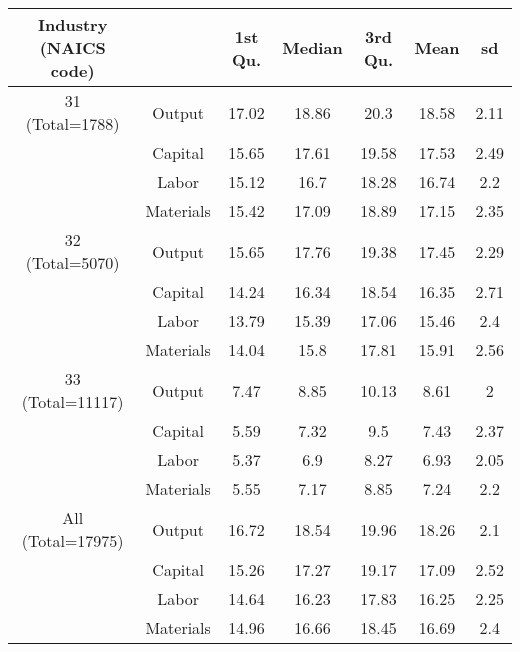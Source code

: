 \begin{table}[H]
\centering
\begin{tabular}{ccccccc}
  \hline\hline Industry (NAICS code) &   & 1st Qu. & Median & 3rd Qu. & Mean & sd \\ 
  \hline
31 (Total=1788) & Output & 17.02 & 18.86 & 20.3 & 18.58 & 2.11 \\ 
   & Capital & 15.65 & 17.61 & 19.58 & 17.53 & 2.49 \\ 
   & Labor & 15.12 & 16.7 & 18.28 & 16.74 & 2.2 \\ 
   & Materials & 15.42 & 17.09 & 18.89 & 17.15 & 2.35 \\ 
  32 (Total=5070) & Output & 15.65 & 17.76 & 19.38 & 17.45 & 2.29 \\ 
   & Capital & 14.24 & 16.34 & 18.54 & 16.35 & 2.71 \\ 
   & Labor & 13.79 & 15.39 & 17.06 & 15.46 & 2.4 \\ 
   & Materials & 14.04 & 15.8 & 17.81 & 15.91 & 2.56 \\ 
  33 (Total=11117) & Output & 7.47 & 8.85 & 10.13 & 8.61 & 2 \\ 
   & Capital & 5.59 & 7.32 & 9.5 & 7.43 & 2.37 \\ 
   & Labor & 5.37 & 6.9 & 8.27 & 6.93 & 2.05 \\ 
   & Materials & 5.55 & 7.17 & 8.85 & 7.24 & 2.2 \\ 
  All (Total=17975) & Output & 16.72 & 18.54 & 19.96 & 18.26 & 2.1 \\ 
   & Capital & 15.26 & 17.27 & 19.17 & 17.09 & 2.52 \\ 
   & Labor & 14.64 & 16.23 & 17.83 & 16.25 & 2.25 \\ 
   & Materials & 14.96 & 16.66 & 18.45 & 16.69 & 2.4 \\ 
   \hline
\end{tabular}
\end{table}
